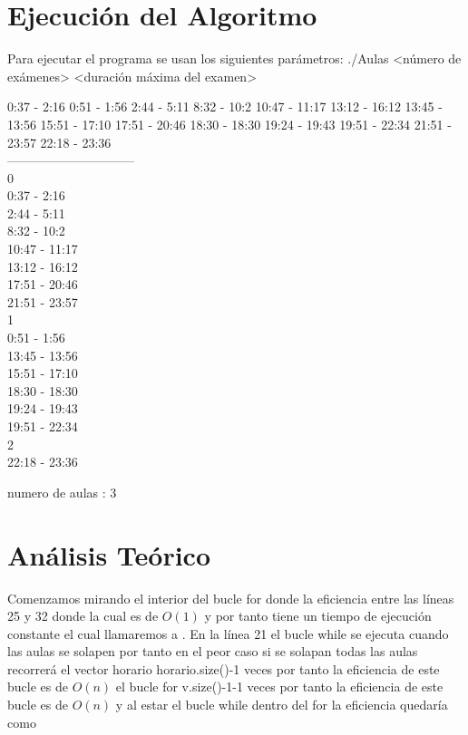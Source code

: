 \documentclass[11pt,openany]{book}
\begin{document}
\section{Ejecución del Algoritmo}
Para ejecutar el programa se usan los siguientes parámetros:
./Aulas <número de exámenes> <duración máxima del examen>

0:37 - 2:16 
0:51 - 1:56 
2:44 - 5:11 
8:32 - 10:2 
10:47 - 11:17 
13:12 - 16:12 
13:45 - 13:56 
15:51 - 17:10 
17:51 - 20:46 
18:30 - 18:30 
19:24 - 19:43 
19:51 - 22:34 
21:51 - 23:57 
22:18 - 23:36 \\

------------------------------\\

0\\
0:37 - 2:16   \\            
2:44 - 5:11 \\
8:32 - 10:2 \\
10:47 - 11:17 \\
13:12 - 16:12 \\
17:51 - 20:46 \\
21:51 - 23:57 \\

1\\
0:51 - 1:56 \\
13:45 - 13:56 \\
15:51 - 17:10 \\
18:30 - 18:30 \\
19:24 - 19:43 \\
19:51 - 22:34 \\

2 \\
22:18 - 23:36 

numero de aulas : 3

\section{Análisis Teórico}
Comenzamos mirando el interior del bucle for donde la eficiencia entre 
las líneas 25 y 32 donde la cual es de $O(1)$ y por tanto tiene un tiempo 
de ejecución constante el cual llamaremos a . 
En la línea 21 el bucle while se ejecuta cuando las aulas se solapen 
por tanto en el peor caso si se solapan todas las aulas recorrerá el vector horario 
horario.size()-1 veces por tanto la eficiencia de este bucle es de $O(n)$ 
el bucle for v.size()-1-1 veces por tanto la eficiencia de este bucle es de $O(n)$
y al estar el bucle while dentro del for la eficiencia quedaría como 
\end{document}
